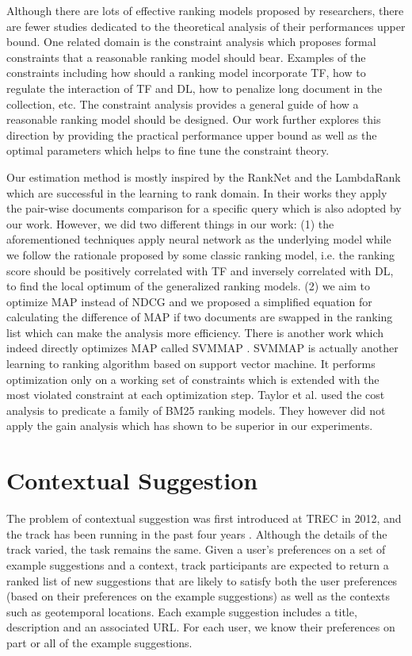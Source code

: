 Although there are lots of effective ranking models proposed by researchers, 
there are fewer studies dedicated to the theoretical analysis of their 
performances upper bound. One related domain is the constraint analysis \cite{Fang:2004:FSI:1008992.1009004} which proposes formal constraints 
that a reasonable ranking model should bear. Examples of the constraints 
including how should a ranking model incorporate TF, how to regulate 
the interaction of TF and DL, how to penalize long document in the 
collection, etc. The constraint analysis provides a general guide of how 
a reasonable ranking model should be designed. Our work further explores 
this direction by providing the practical performance upper bound as 
well as the optimal parameters which helps to fine tune the constraint 
theory. 

Our estimation method is mostly inspired by the RankNet 
\cite{export:68133,export:132652} and the LambdaRank \cite{export:132652,export:81144} which are 
successful in the learning to rank domain. 
In their works they apply the pair-wise documents comparison for a 
specific query which is also adopted by our work.
However, we did two different things in our work: 
(1) the aforementioned techniques apply neural network as the underlying 
model while we follow the rationale proposed by some classic ranking 
model, i.e. the ranking score should be positively correlated with TF and 
inversely correlated with DL, to find the local optimum of the generalized 
ranking models.
(2) we aim to optimize MAP instead of NDCG and we proposed a simplified 
equation for calculating the difference of MAP if two documents are 
swapped in the ranking list which can make the analysis more efficiency. 
There is another work which indeed directly optimizes MAP called SVMMAP \cite{Yue:2007:SVM:1277741.1277790}. SVMMAP is actually another learning 
to ranking algorithm based on support vector machine. It performs 
optimization only on a working set of constraints which is extended with 
the most violated constraint at each optimization step. 
Taylor et al. \cite{Taylor:2006:OMR:1183614.1183698} used the cost 
analysis to predicate a family of BM25 ranking models. They however 
did not apply the gain analysis which has shown to be superior in 
our experiments.


\section{Contextual Suggestion}

The problem of contextual suggestion was first introduced at
TREC in 2012, and the track has been running in the past 
four years \cite{adriel:overview,adriel:overview2013,adriel:overview2014,adriel:overview2015}. 
Although the details of the track varied, the task remains 
the same.  Given a user's preferences on a set of example 
suggestions and a context, track participants
are expected to return a ranked list of new suggestions that 
are likely to satisfy both the user preferences (based on their preferences
on the example suggestions) as well as the contexts such as 
geotemporal locations. Each example suggestion includes a title, 
description and an associated URL. For each user, we know their 
preferences on part or all of the example suggestions. 

